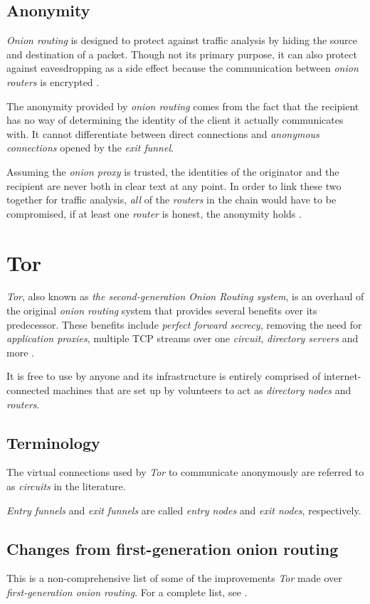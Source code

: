 \documentclass{sig-alternate}
\begin{document}
\subsection{Anonymity}
\emph{Onion routing} is designed to protect against traffic analysis by hiding the source and destination of a
packet. Though not its primary purpose, it can also protect against eavesdropping as a side effect because
the communication between \emph{onion routers} is encrypted \cite{reed1998}.

The anonymity provided by \emph{onion routing} comes from the fact that the recipient has no way
of determining the identity of the client it actually communicates with. It cannot differentiate
between direct connections and \emph{anonymous connections} opened by the \emph{exit funnel}.

Assuming the \emph{onion proxy} is trusted, the identities of the originator and the recipient are
never both in clear text at any point. In order to link these two together for traffic analysis,
\emph{all} of the \emph{routers} in the chain would have to be compromised, if at least one
\emph{router} is honest, the anonymity holds \cite{reed1998}.


\section{Tor}
\emph{Tor}, also known as \emph{the second-generation Onion Routing system}, is an
overhaul of the original \emph{onion routing} system that provides several benefits over its predecessor.
These benefits include \emph{perfect forward secrecy}, removing the need for \emph{application proxies},
multiple TCP streams over one \emph{circuit}, \emph{directory servers} and more \cite{tor2004}.

It is free
to use by anyone and its infrastructure is entirely comprised of internet-connected machines that are
set up by volunteers to act as \emph{directory nodes} and \emph{routers}.

\subsection{Terminology}
The virtual connections used by \emph{Tor} to communicate anonymously are referred to as \emph{circuits}
in the literature.

\emph{Entry funnels} and \emph{exit funnels} are called \emph{entry nodes} and \emph{exit nodes},
respectively.

\subsection{Changes from first-generation onion routing}
This is a non-comprehensive list of some of the improvements \emph{Tor} made over 
\emph{first-generation onion routing}. For a complete list, see \cite{tor2004}.
\end{document}
